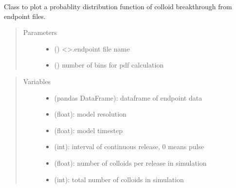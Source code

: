 \documentclass[letterpaper,10pt,english]{sphinxmanual}
\begin{document}
\begin{fulllineitems}
\label{\detokenize{index:lb_colloids.Colloids.Colloid_output.DistributionFunction}}
Class to plot a probablity distribution function of colloid breakthrough
from endpoint files.
\begin{quote}\begin{description}
\item[{Parameters}] \leavevmode\begin{itemize}
\item {} 
 () \textendash{} \textless{}\textgreater{}.endpoint file name

\item {} 
 () \textendash{} number of bins for pdf calculation

\end{itemize}

\end{description}\end{quote}
\begin{quote}\begin{description}
\item[{Variables}] \leavevmode\begin{itemize}
\item {} 
 \textendash{} (pandas DataFrame): dataframe of endpoint data

\item {} 
{\hyperref[\detokenize{index:lb_colloids.LB.LB_2Dpermeability.LB2DModel.resolution}]{}} \textendash{} (float): model resolution

\item {} 
 \textendash{} (float): model timestep

\item {} 
 \textendash{} (int): interval of continuous release, 0 means pulse

\item {} 
 \textendash{} (float): number of colloids per release in simulation

\item {} 
 \textendash{} (int): total number of colloids in simulation


\end{itemize}
\end{description}
\end{quote}
\end{fulllineitems}
\end{document}
